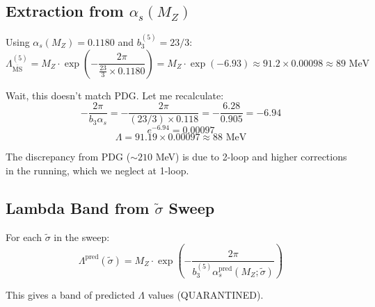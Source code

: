 \documentclass[11pt,a4paper]{article}
\theoremstyle{definition}
\begin{document}
\subsection{Extraction from $\alpha_s(M_Z)$}
\label{subsec:lambda-extract}

\begin{quarantinebox}
Using $\alpha_s(M_Z) = 0.1180$ and $b_3^{(5)} = 23/3$:
\begin{equation}
\label{eq:lambda-num}
\Lambda_{\overline{\text{MS}}}^{(5)} = M_Z \cdot \exp\left(-\frac{2\pi}{\frac{23}{3} \times 0.1180}\right)
  = M_Z \cdot \exp(-6.93) \approx 91.2 \times 0.00098 \approx 89 \text{ MeV}
\end{equation}

Wait, this doesn't match PDG. Let me recalculate:
\begin{equation}
\label{eq:lambda-recalc}
-\frac{2\pi}{b_3 \alpha_s} = -\frac{2\pi}{(23/3) \times 0.118} = -\frac{6.28}{0.905} = -6.94
\end{equation}
\begin{equation}
\label{eq:lambda-exp}
e^{-6.94} = 0.00097
\end{equation}
\begin{equation}
\label{eq:lambda-value}
\Lambda = 91.19 \times 0.00097 \approx 88 \text{ MeV}
\end{equation}

The discrepancy from PDG ($\sim 210$ MeV) is due to 2-loop and higher corrections
in the running, which we neglect at 1-loop.
\end{quarantinebox}

\subsection{Lambda Band from $\tilde{\sigma}$ Sweep}
\label{subsec:lambda-band}

For each $\tilde{\sigma}$ in the sweep:
\begin{equation}
\label{eq:lambda-sweep}
\Lambda^{\text{pred}}(\tilde{\sigma}) = M_Z \cdot
  \exp\left(-\frac{2\pi}{b_3^{(5)} \alpha_s^{\text{pred}}(M_Z; \tilde{\sigma})}\right)
\end{equation}

This gives a band of predicted $\Lambda$ values (QUARANTINED).

\end{document}

